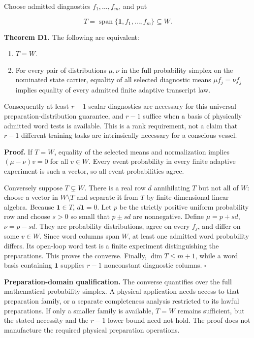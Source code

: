 \documentclass[
  11pt,
  a4paper,
]{article}
\providecommand{\tightlist}{%
  \setlength{\itemsep}{0pt}\setlength{\parskip}{0pt}}
\begin{document}
Choose admitted diagnostics \(f_1,\ldots,f_m\), and put

\[
T=\operatorname{span}\{\mathbf1,f_1,\ldots,f_m\}\subseteq W.
\]

\textbf{Theorem D1.} The following are equivalent:

\begin{enumerate}
\def\labelenumi{\arabic{enumi}.}
\tightlist
\item
  \(T=W\).
\item
  For every pair of distributions \(\mu,\nu\) in the full probability
  simplex on the nominated state carrier, equality of all selected
  diagnostic means \(\mu f_j=\nu f_j\) implies equality of every
  admitted finite adaptive transcript law.
\end{enumerate}

Consequently at least \(r-1\) scalar diagnostics are necessary for this
universal preparation-distribution guarantee, and \(r-1\) suffice when a
basis of physically admitted word tests is available. This is a rank
requirement, not a claim that \(r-1\) different training tasks are
intrinsically necessary for a conscious vessel.

\textbf{Proof.} If \(T=W\), equality of the selected means and
normalization implies \((\mu-\nu)v=0\) for all \(v\in W\). Every event
probability in every finite adaptive experiment is such a vector, so all
event probabilities agree.

Conversely suppose \(T\subsetneq W\). There is a real row \(d\)
annihilating \(T\) but not all of \(W\): choose a vector in
\(W\setminus T\) and separate it from \(T\) by finite-dimensional linear
algebra. Because \(\mathbf1\in T\), \(d\mathbf1=0\). Let \(p\) be the
strictly positive uniform probability row and choose \(s>0\) so small
that \(p\pm sd\) are nonnegative. Define \(\mu=p+sd\), \(\nu=p-sd\).
They are probability distributions, agree on every \(f_j\), and differ
on some \(v\in W\). Since word columns span \(W\), at least one admitted
word probability differs. Its open-loop word test is a finite experiment
distinguishing the preparations. This proves the converse. Finally,
\(\dim T\le m+1\), while a word basis containing \(\mathbf1\) supplies
\(r-1\) nonconstant diagnostic columns. \(\square\)

\textbf{Preparation-domain qualification.} The converse quantifies over
the full mathematical probability simplex. A physical application needs
access to that preparation family, or a separate completeness analysis
restricted to its lawful preparations. If only a smaller family is
available, \(T=W\) remains sufficient, but the stated necessity and the
\(r-1\) lower bound need not hold. The proof does not manufacture the
required physical preparation operations.
\end{document}
